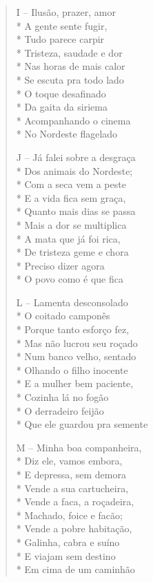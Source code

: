 \begin{verse}
I -- Ilusão, prazer, amor\\*
A gente sente fugir,\\*
Tudo parece carpir\\*
Tristeza, saudade e dor\\*
Nas horas de mais calor\\*
Se escuta pra todo lado\\*
O toque desafinado\\*
Da gaita da siriema\\*
Acompanhando o cinema\\*
No Nordeste flagelado

J -- Já falei sobre a desgraça\\*
Dos animais do Nordeste;\\*
Com a seca vem a peste\\*
E a vida fica sem graça,\\*
Quanto mais dias se passa\\*
Mais a dor se multiplica\\*
A mata que já foi rica,\\*
De tristeza geme e chora\\*
Preciso dizer agora\\*
O povo como é que fica

L -- Lamenta desconsolado\\*
O coitado camponês\\*
Porque tanto esforço fez,\\*
Mas não lucrou seu roçado\\*
Num banco velho, sentado\\*
Olhando o filho inocente\\*
E a mulher bem paciente,\\*
Cozinha lá no fogão\\*
O derradeiro feijão\\*
Que ele guardou pra semente

M -- Minha boa companheira,\\*
Diz ele, vamos embora,\\*
E depressa, sem demora\\*
Vende a sua cartucheira,\\*
Vende a faca, a roçadeira,\\*
Machado, foice e facão;\\*
Vende a pobre habitação,\\*
Galinha, cabra e suíno\\*
E viajam sem destino\\*
Em cima de um caminhão


\end{verse}
